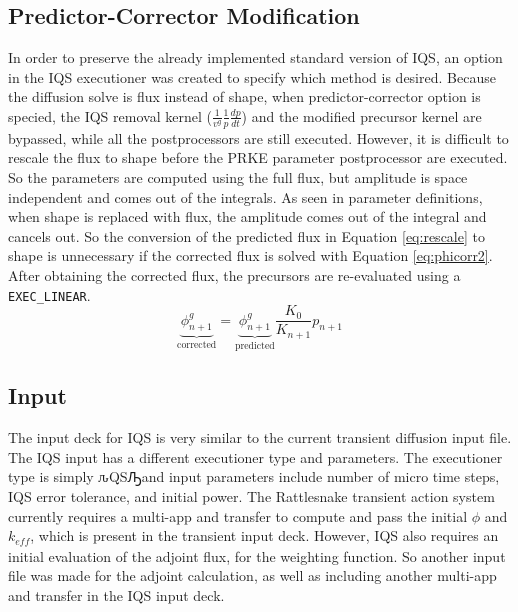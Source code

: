 \documentclass[12pt]{scrartcl}
\newcommand{\keff}{k_\textit{eff}}
\newcommand{\be}{\begin{equation}}
\newcommand{\ee}{\end{equation}}
\begin{document}
\subsection{Predictor-Corrector Modification}
In order to preserve the already implemented standard version of IQS, an option in the IQS executioner was created to specify which method is desired.  Because the diffusion solve is flux instead of shape, when predictor-corrector option is specied, the IQS removal kernel ($\frac{1}{v^g}\frac{1}{p}\frac{dp}{dt}$) and the modified precursor kernel are bypassed, while all the postprocessors are still executed.  However, it is difficult to rescale the flux to shape before the PRKE parameter postprocessor are executed.  So the parameters are computed using the full flux, but amplitude is space independent and comes out of the integrals.  As seen in parameter definitions, when shape is replaced with flux, the amplitude comes out of the integral and cancels out.  So the conversion of the predicted flux in Equation \ref{eq:rescale} to shape is unnecessary if the corrected flux is solved with Equation \ref{eq:phicorr2}.  After obtaining the corrected flux, the precursors are re-evaluated using a \texttt{EXEC\_LINEAR}.
\be
\underbrace{\phi^g_{n+1}}_{\text{corrected}} = \underbrace{\phi^g_{n+1}}_{\text{predicted}} \frac{K_0}{K_{n+1}} p_{n+1}
\label{eq:phicorr2}
\ee

\subsection{Input}
The input deck for IQS is very similar to the current transient diffusion input file.  The IQS input has a different executioner type and parameters.  The executioner type is simply ԉQSԠand input parameters include number of micro time steps, IQS error tolerance, and initial power.  The Rattlesnake transient action system currently requires a multi-app and transfer to compute and pass the initial $\phi$ and $\keff$, which is present in the transient input deck.  However, IQS also requires an initial evaluation of the adjoint flux, for the weighting function.  So another input file was made for the adjoint calculation, as well as including another multi-app and transfer in the IQS input deck.
\end{document}
